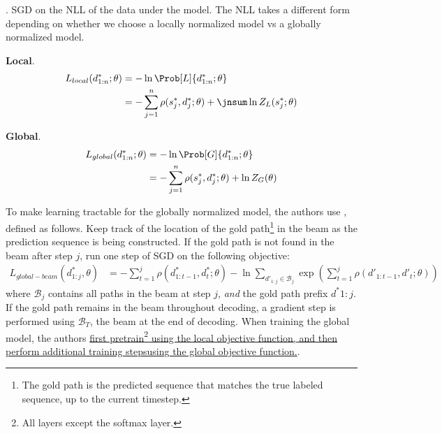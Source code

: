 \documentclass[11pt]{article}
\newcommand\myspace[1][]{\vspace{#1\bigskipamount}}
\newcommand\p{\Needspace{10\baselineskip} \noindent}
\begin{document}
\myspace
\p {}. SGD on the NLL of the data under the model. The NLL takes a different form depending on whether we choose a locally normalized model vs a globally normalized model. 
\begin{compactitem}
	\item \textbf{Local}. 
	\begin{align}
		L_{local}(d_{1:n}^*; \theta )
		&= - \ln \Prob[L]{d_{1:n}^*; \theta} \\
		&=  -  \sum_{j = 1}^{n} \rho  ( s_j^*, d_j^* ; \theta  ) + \jnsum \ln Z_L (s_j^*; \theta) 
	\end{align}
	
	\item \textbf{Global}. 
	\begin{align}
		L_{global}(d_{1:n}^* ; \theta) 
		&=  - \ln \Prob[G]{d_{1:n}^*; \theta} \\
		&= -  \sum_{j = 1}^{n} \rho  ( s_j^*, d_j^* ; \theta  )  + \ln Z_G ( \theta) 
	\end{align}
\end{compactitem}
To make learning tractable for the globally normalized model, the authors use , defined as follows. Keep track of the location of the gold path\footnote{The gold path is the predicted sequence that matches the true labeled sequence, up to the current timestep.} in the beam as the prediction sequence is being constructed. If the gold path is not found in the beam after step $j$, run one step of SGD on the following objective:
\begin{align}
L_{global-beam}(d^*_{1:j}, \theta) 
&= -\sum_{t=1}^{j} \rho(d^*_{1:t-1}, d^*_t ; \theta) 
- \ln \sum_{d'_{1:j} \in \mathcal{B}_j} \exp\left( 
\sum_{t = 1}^j \rho(d'_{1:t-1}, d'_t; \theta)
\right)
\end{align}
where $\mathcal{B}_j$ contains all paths in the beam at step $j$, \textit{and} the gold path prefix $d^*{1:j}$. If the gold path remains in the beam throughout decoding, a gradient step is performed using $\mathcal{B}_T$, the beam at the end of decoding. When training the global model, the authors \underline{first pretrain\footnote{All layers except the softmax layer.} using the local objective function, and then perform additional training steps}\newline\underline{using the global objective function.}.
\end{document}
